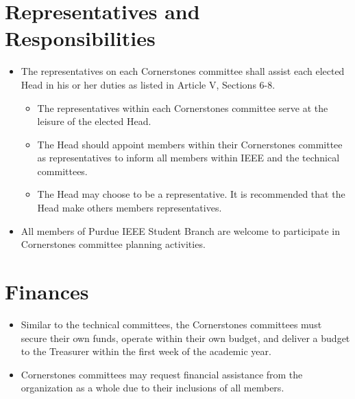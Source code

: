 \documentclass[12pt]{constitution}
\begin{document}
\section{Representatives and Responsibilities}
\label{sec:corner_represent}
\begin{itemize}
    \item The representatives on each Cornerstones committee shall assist each elected Head in his or her duties as listed in Article V, Sections 6-8.
	\begin{itemize}
	\item The representatives within each Cornerstones committee serve at the leisure of the elected Head.
    \item The Head should appoint members within their Cornerstones committee as representatives to inform all members within IEEE and the technical committees.
	\item The Head may choose to be a representative. It is recommended that the Head make others members representatives.
	\end{itemize}
    \item All members of Purdue IEEE Student Branch are welcome to participate in Cornerstones committee planning activities.
\end{itemize}

\section{Finances}
\label{sec:corner_finance}
\begin{itemize}
    \item Similar to the technical committees, the Cornerstones committees must secure their own funds, operate within their own budget, and deliver a budget to the Treasurer within the first week of the academic year.
    \item Cornerstones committees may request financial  assistance from the organization as a whole due to their inclusions of all members.
\end{itemize}


\label{art:technical}
\end{document}
